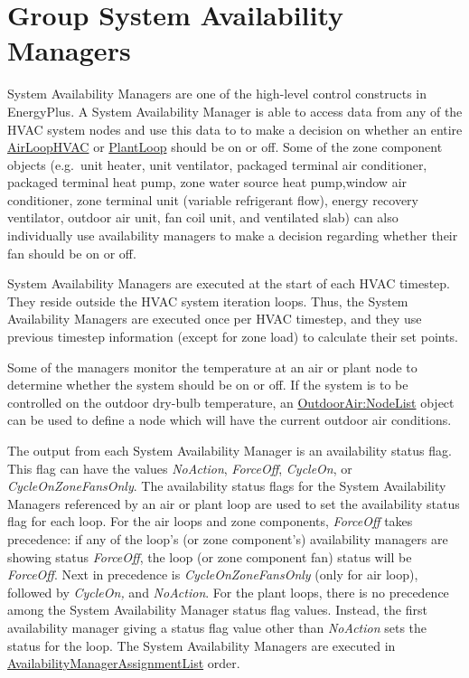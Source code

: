 \section{Group System Availability Managers}\label{group-system-availability-managers}

System Availability Managers are one of the high-level control constructs in EnergyPlus. A System Availability Manager is able to access data from any of the HVAC system nodes and use this data to to make a decision on whether an entire \hyperref[airloophvac]{AirLoopHVAC} or \hyperref[plantloop]{PlantLoop} should be on or off. Some of the zone component objects (e.g.~unit heater, unit ventilator, packaged terminal air conditioner, packaged terminal heat pump, zone water source heat pump,window air conditioner, zone terminal unit (variable refrigerant flow), energy recovery ventilator, outdoor air unit, fan coil unit, and ventilated slab) can also individually use availability managers to make a decision regarding whether their fan should be on or off.

System Availability Managers are executed at the start of each HVAC timestep. They reside outside the HVAC system iteration loops. Thus, the System Availability Managers are executed once per HVAC timestep, and they use previous timestep information (except for zone load) to calculate their set points.

Some of the managers monitor the temperature at an air or plant node to determine whether the system should be on or off. If the system is to be controlled on the outdoor dry-bulb temperature, an \hyperref[outdoorairnodelist]{OutdoorAir:NodeList} object can be used to define a node which will have the current outdoor air conditions.

The output from each System Availability Manager is an availability status flag. This flag can have the values \emph{NoAction}, \emph{ForceOff}, \emph{CycleOn}, or \emph{CycleOnZoneFansOnly}. The availability status flags for the System Availability Managers referenced by an air or plant loop are used to set the availability status flag for each loop. For the air loops and zone components, \emph{ForceOff} takes precedence: if any of the loop's (or zone component's) availability managers are showing status \emph{ForceOff}, the loop (or zone component fan) status will be \emph{ForceOff}. Next in precedence is \emph{CycleOnZoneFansOnly} (only for air loop), followed by \emph{CycleOn,} and \emph{NoAction}. For the plant loops, there is no precedence among the System Availability Manager status flag values. Instead, the first availability manager giving a status flag value other than \emph{NoAction} sets the status for the loop. The System Availability Managers are executed in \hyperref[availabilitymanagerassignmentlist]{AvailabilityManagerAssignmentList} order.

